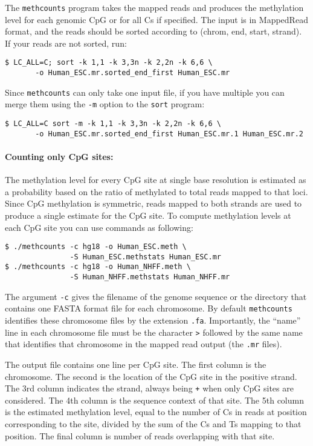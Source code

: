 \documentclass[10pt]{article}
\newcommand{\prog}[1]{\texttt{#1}}
\newcommand{\fn}[1]{\texttt{#1}}
\newcommand{\lit}[1]{\texttt{#1}}
\newcommand{\op}[1]{\texttt{#1}}
\begin{document}
The \prog{methcounts} program takes the mapped reads and produces the
methylation level for each genomic CpG or for all Cs if specified.
The input is in MappedRead format, and the reads should be sorted
according to (chrom, end, start, strand). If your reads are not
sorted, run:
\begin{verbatim}
$ LC_ALL=C; sort -k 1,1 -k 3,3n -k 2,2n -k 6,6 \
       -o Human_ESC.mr.sorted_end_first Human_ESC.mr
\end{verbatim}
Since \prog{methcounts} can only take one input file, if you have
multiple you can merge them using the \op{-m} option to the
\prog{sort} program:
\begin{verbatim}
$ LC_ALL=C sort -m -k 1,1 -k 3,3n -k 2,2n -k 6,6 \
       -o Human_ESC.mr.sorted_end_first Human_ESC.mr.1 Human_ESC.mr.2
\end{verbatim}


\paragraph{Counting only CpG sites:}
The methylation level for every CpG site at single base resolution is
estimated as a probability based on the ratio of methylated to total
reads mapped to that loci. Since CpG methylation is symmetric, reads
mapped to both strands are used to produce a single estimate for the
CpG site. To compute methylation levels at each CpG site you can use
commands as following:
\begin{verbatim}
$ ./methcounts -c hg18 -o Human_ESC.meth \
               -S Human_ESC.methstats Human_ESC.mr
$ ./methcounts -c hg18 -o Human_NHFF.meth \
               -S Human_NHFF.methstats Human_NHFF.mr
\end{verbatim}
The argument \op{-c} gives the filename of the genome sequence or the
directory that contains one FASTA format file for each chromosome. By
default \prog{methcounts} identifies these chromosome files by the
extension \fn{.fa}. Importantly, the ``name'' line in each chromosome
file must be the character \lit{>} followed by the same name that
identifies that chromosome in the mapped read output (the \fn{.mr}
files).

The output file contains one line per CpG site. The first column is
the chromosome. The second is the location of the CpG site in the
positive strand. The 3rd column indicates the strand, always being
\lit{+} when only CpG sites are considered. The 4th column is the
sequence context of that site. The 5th column is the estimated
methylation level, equal to the number of Cs in reads at position
corresponding to the site, divided by the sum of the Cs and Ts mapping
to that position. The final column is number of reads overlapping with
that site.
\end{document}
